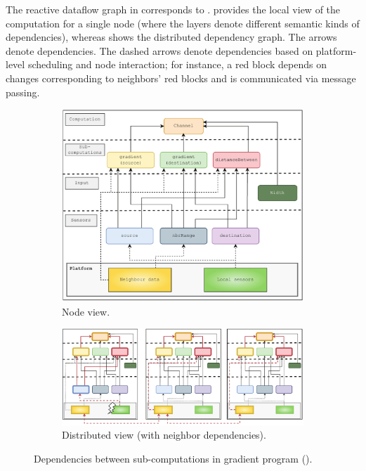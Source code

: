

The reactive dataflow graph in  corresponds to .  provides the local view of the computation for a single node (where the layers denote different semantic kinds of dependencies), whereas  shows the distributed dependency graph. The arrows denote dependencies. The dashed arrows denote dependencies based on platform-level scheduling and node interaction; for instance, a red block depends on changes corresponding to neighbors' red blocks and is communicated via message passing.

\begin{figure}
    \centering
    \begin{subfigure}[b]{\textwidth}
        \centering
        \includegraphics[width=\textwidth]{figures/gradient-dependencies.png}
        \caption{Node view.}
        \label{fig:gradient-dependencies}
    \end{subfigure}
    \hfill
    \begin{subfigure}[b]{\textwidth}
        \centering
        \includegraphics[width=\textwidth]{figures/gradient-dependencies-distributed.png}
        \caption{Distributed view (with neighbor dependencies).}
        \label{fig:gradient-dependencies-distributed}
    \end{subfigure}
    \caption{Dependencies between sub-computations in gradient program ().}
\end{figure}

